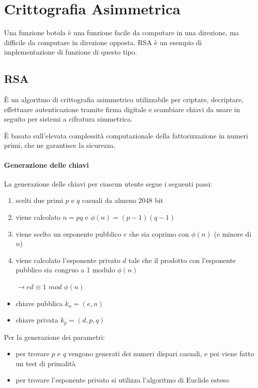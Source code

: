 \chapter{Crittografia Asimmetrica}

Una funzione botola è una funzione facile da computare in una direzione, ma difficile da computare in direzione
opposta. RSA è un esempio di implementazione di funzione di questo tipo.

\section{RSA}

È un algoritmo di crittografia asimmetrico utilizzabile per criptare, decriptare, effettuare autenticazione tramite firma
digitale e scambiare chiavi da usare in seguito per sistemi a cifratura simmetrica.

\noindent È basato sull’elevata complessità computazionale della fattorizzazione in numeri primi, che ne garantisce la sicurezza.

\subsubsection{Generazione delle chiavi}

La generazione delle chiavi per ciascun utente segue i seguenti passi:
\begin{enumerate}
    \item scelti due primi $p$ e $q$ casuali da almeno 2048 bit 
    \item viene calcolato $n=pq$ e $\phi(n)=(p-1)(q-1)$
    \item viene scelto un esponente pubblico $e$ che sia coprimo con $\phi(n)$ (e minore di $n$)
    \item viene calcolato l'esponente privato $d$ tale che il prodotto con l'esponente pubblico 
    sia congruo a 1 modulo $\phi(n)$

    $\rightarrow ed \equiv 1$ $mod$ $\phi(n)$ 
\end{enumerate}

\begin{itemize}
    \item chiave pubblica $k_u = (e,n)$
    \item chiave privata $k_p = (d, p, q)$
\end{itemize} 

\noindent Per la generazione dei parametri:
\begin{itemize}
    \item per trovare $p$ e $q$ vengono generati dei numeri dispari casuali, e poi viene fatto un test di primalità 
    \item per trovare l'esponente privato si utilizza l'algoritmo di Euclide esteso
\end{itemize}

